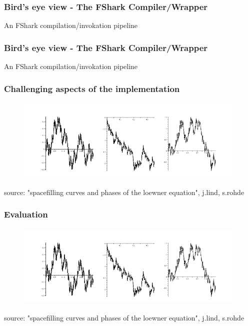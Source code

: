 \documentclass[10pt, compress]{beamer}
\begin{document}
\begin{frame}[plain,c]
  \frametitle{Bird's eye view - The FShark Compiler/Wrapper}
  \begin{center}
    \Huge An FShark compilation/invokation pipeline
  \end{center}
\end{frame}

\begin{frame}[fragile]
  \frametitle{Bird's eye view - The FShark Compiler/Wrapper}
  \begin{center}
    \Huge An FShark compilation/invokation pipeline
  \end{center}
\end{frame}
  

\begin{frame}[fragile]
  \frametitle{Challenging aspects of the implementation}




\begin{figure}
  \centering
 \includegraphics[width=11cm,height=4cm]{intro2.png}
\end{figure}
\tiny
source: "spacefilling curves and phases of the loewner equation", j.lind, s.rohde
\normalsize
\end{frame}

\begin{frame}[fragile]
  \frametitle{Evaluation}

  

\begin{figure}
  \centering
 \includegraphics[width=11cm,height=4cm]{intro2.png}
\end{figure}
\tiny
source: "spacefilling curves and phases of the loewner equation", j.lind, s.rohde
\normalsize
\end{frame}
\end{document}
